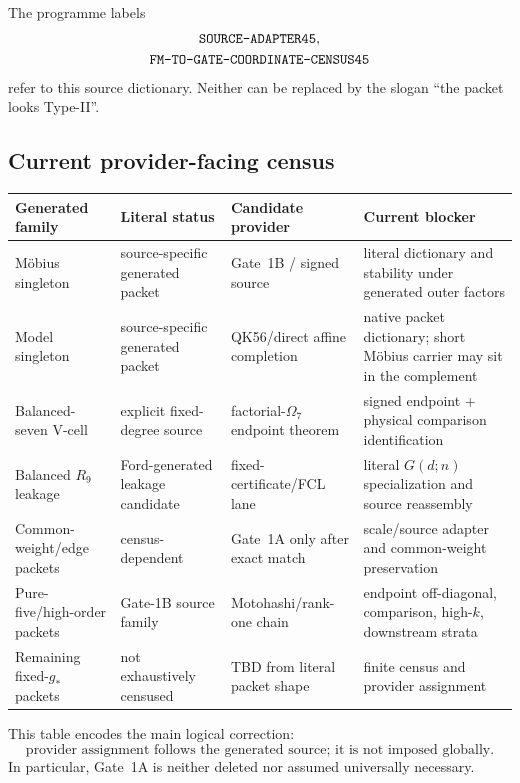 \documentclass[11pt]{article}
\theoremstyle{definition}
\newcommand{\1}{\mathbf 1}
\begin{document}
{{{The programme labels
\[
\begin{gathered}
\text{\ttfamily SOURCE-ADAPTER45},\\
\text{\ttfamily FM-TO-GATE-COORDINATE-CENSUS45}
\end{gathered}
\]
refer to this source dictionary.  Neither can be replaced by the slogan ``the packet looks
Type-II''.

\subsection{Current provider-facing census}

\begin{center}
\renewcommand{\arraystretch}{1.18}
\begin{tabularx}{\textwidth}{>{\raggedright\arraybackslash}p{}
>{\raggedright\arraybackslash}p{}
>{\raggedright\arraybackslash}p{}X}
\toprule
Generated family & Literal status & Candidate provider & Current blocker\\
\midrule
M\"obius singleton & source-specific generated packet &
Gate~1B / signed source &
literal dictionary and stability under generated outer factors\\
Model singleton & source-specific generated packet &
QK56/direct affine completion &
native packet dictionary; short M\"obius carrier may sit in the complement\\
Balanced-seven V-cell & explicit fixed-degree source &
factorial-$\Omega_7$ endpoint theorem &
signed endpoint + physical comparison identification\\
Balanced $R_9$ leakage & Ford-generated leakage candidate &
fixed-certificate/FCL lane &
literal $G(d;n)$ specialization and source reassembly\\
Common-weight/edge packets & census-dependent &
Gate~1A only after exact match &
scale/source adapter and common-weight preservation\\
Pure-five/high-order packets & Gate-1B source family &
Motohashi/rank-one chain &
endpoint off-diagonal, comparison, high-$k$, downstream strata\\
Remaining fixed-$g_\ast$ packets & not exhaustively censused &
TBD from literal packet shape &
finite census and provider assignment\\
\bottomrule
\end{tabularx}
\end{center}

This table encodes the main logical correction:
\[
\boxed{
\text{provider assignment follows the generated source; it is not imposed globally.}
}
\]
In particular, Gate~1A is neither deleted nor assumed universally necessary.

}}}
\end{document}
